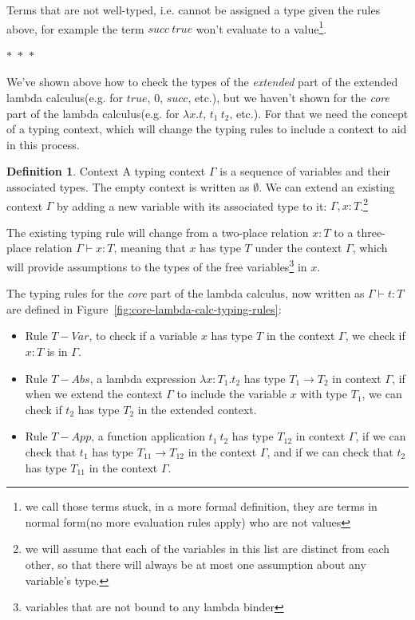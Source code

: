 \documentclass[
       embeddedlogo,
       english,
       lmodern,
       coorientadorbanca,
       noabntexcite
]{ufsc-thesis-rn46-2019}
\theoremstyle{definition}
\newtheorem{definition}{Definition}[section]
\newcommand{\fnarrow}{\rightarrow}
\newcommand{\sep}{\begin{center}$\ast$~$\ast$~$\ast$\end{center}}
\begin{document}
Terms that are not well-typed, i.e. cannot be assigned a type given the rules above, for example the term $succ\ true$ won't evaluate to a value\footnote{we call those terms stuck, in a more formal definition, they are terms in normal form(no more evaluation rules apply) who are not  values}.

\sep

We've shown above how to check the types of the \emph{extended} part of the extended lambda calculus(e.g. for $true$, $0$, $succ$, etc.), but we haven't shown for the \emph{core} part of the lambda calculus(e.g. for $\lambda x.t$, $t_1\ t_2$, etc.).
For that we need the concept of a typing context, which will change the typing rules to include a context to aid in this process.

\begin{definition}{Context}
       A typing context $\Gamma$ is a sequence of variables and their associated types.
       The empty context is written as $\emptyset$.
       We can extend an existing context $\Gamma$ by adding a new variable with its associated type to it: $\Gamma, x : T$.\footnote{we will assume that each of the variables in this list are distinct from each other, so that there will always be at most one assumption about any variable's type.}

       The existing typing rule will change from a two-place relation $x : T$ to a three-place relation $\Gamma \vdash x : T$, meaning that $x$ has type $T$ under the context $\Gamma$, which will provide assumptions to the types of the free variables\footnote{variables that are not bound to any lambda binder} in $x$.
\end{definition}

The typing rules for the \emph{core} part of the lambda calculus, now written as $\Gamma \vdash t : T$ are defined in Figure~\ref{fig:core-lambda-calc-typing-rules}:
\begin{itemize}
       \item Rule $T-Var$, to check if a variable $x$ has type $T$ in the context $\Gamma$, we check if $x:T$ is in $\Gamma$.
       \item Rule $T-Abs$, a lambda expression $\lambda x:T_1.t_2$ has type $T_1 \fnarrow T_2$ in context $\Gamma$, if when we extend the context $\Gamma$ to include the variable $x$ with type $T_1$, we can check if $t_2$ has type $T_2$ in the extended context.
       \item Rule $T-App$, a function application $t_1\ t_2$ has type $T_{12}$ in context $\Gamma$, if we can check that $t_1$ has type $T_{11} \fnarrow T_{12}$ in the context $\Gamma$, and if we can check that $t_2$ has type $T_{11}$ in the context $\Gamma$.
\end{itemize}
\end{document}
